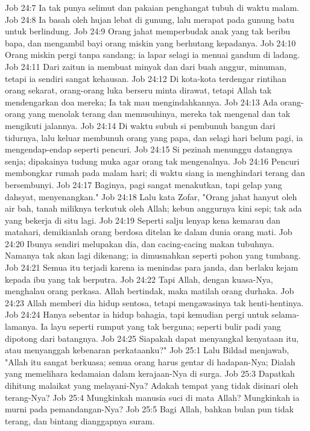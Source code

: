 Job 24:7  Ia tak punya selimut dan pakaian penghangat tubuh di waktu malam.
Job 24:8  Ia basah oleh hujan lebat di gunung, lalu merapat pada gunung batu untuk berlindung.
Job 24:9  Orang jahat memperbudak anak yang tak beribu bapa, dan mengambil bayi orang miskin yang berhutang kepadanya.
Job 24:10  Orang miskin pergi tanpa sandang; ia lapar selagi ia menuai gandum di ladang.
Job 24:11  Dari zaitun ia membuat minyak dan dari buah anggur, minuman, tetapi ia sendiri sangat kehausan.
Job 24:12  Di kota-kota terdengar rintihan orang sekarat, orang-orang luka berseru minta dirawat, tetapi Allah tak mendengarkan doa mereka; Ia tak mau mengindahkannya.
Job 24:13  Ada orang-orang yang menolak terang dan memusuhinya, mereka tak mengenal dan tak mengikuti jalannya.
Job 24:14  Di waktu subuh si pembunuh bangun dari tidurnya, lalu keluar membunuh orang yang papa, dan selagi hari belum pagi, ia mengendap-endap seperti pencuri.
Job 24:15  Si pezinah menunggu datangnya senja; dipakainya tudung muka agar orang tak mengenalnya.
Job 24:16  Pencuri membongkar rumah pada malam hari; di waktu siang ia menghindari terang dan bersembunyi.
Job 24:17  Baginya, pagi sangat menakutkan, tapi gelap yang dahsyat, menyenangkan."
Job 24:18  Lalu kata Zofar, "Orang jahat hanyut oleh air bah, tanah miliknya terkutuk oleh Allah; kebun anggurnya kini sepi; tak ada yang bekerja di situ lagi.
Job 24:19  Seperti salju lenyap kena kemarau dan matahari, demikianlah orang berdosa ditelan ke dalam dunia orang mati.
Job 24:20  Ibunya sendiri melupakan dia, dan cacing-cacing makan tubuhnya. Namanya tak akan lagi dikenang; ia dimusnahkan seperti pohon yang tumbang.
Job 24:21  Semua itu terjadi karena ia menindas para janda, dan berlaku kejam kepada ibu yang tak berputra.
Job 24:22  Tapi Allah, dengan kuasa-Nya, menghalau orang perkasa. Allah bertindak, maka matilah orang durhaka.
Job 24:23  Allah memberi dia hidup sentosa, tetapi mengawasinya tak henti-hentinya.
Job 24:24  Hanya sebentar ia hidup bahagia, tapi kemudian pergi untuk selama-lamanya. Ia layu seperti rumput yang tak berguna; seperti bulir padi yang dipotong dari batangnya.
Job 24:25  Siapakah dapat menyangkal kenyataan itu, atau menyanggah kebenaran perkataanku?"
Job 25:1  Lalu Bildad menjawab, "Allah itu sangat berkuasa; semua orang harus gentar di hadapan-Nya; Dialah yang memelihara kedamaian dalam kerajaan-Nya di surga.
Job 25:3  Dapatkah dihitung malaikat yang melayani-Nya? Adakah tempat yang tidak disinari oleh terang-Nya?
Job 25:4  Mungkinkah manusia suci di mata Allah? Mungkinkah ia murni pada pemandangan-Nya?
Job 25:5  Bagi Allah, bahkan bulan pun tidak terang, dan bintang dianggapnya suram.
